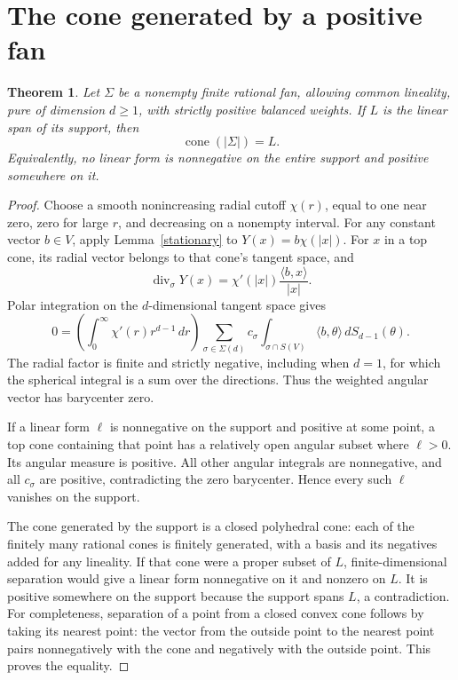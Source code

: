 \documentclass[11pt]{article}
\newtheorem{theorem}{Theorem}
\begin{document}
\section{The cone generated by a positive fan}
\begin{theorem}\label{fan}
Let $\Sigma$ be a nonempty finite rational fan, allowing common lineality, pure of dimension $d\geq1$, with strictly positive balanced weights. If $L$ is the linear span of its support, then
\[\operatorname{cone}(|\Sigma|)=L.
\]
Equivalently, no linear form is nonnegative on the entire support and positive somewhere on it.
\end{theorem}
\begin{proof}
Choose a smooth nonincreasing radial cutoff $\chi(r)$, equal to one near zero, zero for large $r$, and decreasing on a nonempty interval. For any constant vector $b\in V$, apply Lemma~\ref{stationary} to $Y(x)=b\chi(|x|)$. For $x$ in a top cone, its radial vector belongs to that cone's tangent space, and
\[\operatorname{div}_\sigma Y(x)
      =\chi'(|x|)\frac{\langle b,x\rangle}{|x|}.
\]
Polar integration on the $d$-dimensional tangent space gives
\[0=\left(\int_0^\infty\chi'(r)r^{d-1}\,dr\right)
 \sum_{\sigma\in\Sigma(d)}c_\sigma
     \int_{\sigma\cap S(V)}\langle b,\theta\rangle\,dS_{d-1}(\theta).
\]
The radial factor is finite and strictly negative, including when $d=1$, for which the spherical integral is a sum over the directions. Thus the weighted angular vector has barycenter zero.

If a linear form $\ell$ is nonnegative on the support and positive at some point, a top cone containing that point has a relatively open angular subset where $\ell>0$. Its angular measure is positive. All other angular integrals are nonnegative, and all $c_\sigma$ are positive, contradicting the zero barycenter. Hence every such $\ell$ vanishes on the support.

The cone generated by the support is a closed polyhedral cone: each of the finitely many rational cones is finitely generated, with a basis and its negatives added for any lineality. If that cone were a proper subset of $L$, finite-dimensional separation would give a linear form nonnegative on it and nonzero on $L$. It is positive somewhere on the support because the support spans $L$, a contradiction. For completeness, separation of a point from a closed convex cone follows by taking its nearest point: the vector from the outside point to the nearest point pairs nonnegatively with the cone and negatively with the outside point. This proves the equality.
\end{proof}
\end{document}
